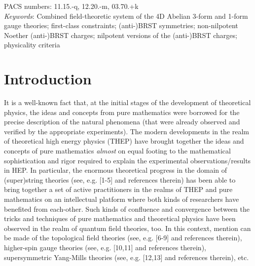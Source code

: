 \documentclass[12pt]{article}
\begin{document}
\vskip 1.0cm
\noindent
PACS numbers: 11.15.-q, 12.20.-m, 03.70.+k \\








\vskip 0.5cm
\noindent
{\it {Keywords}}: Combined field-theoretic system of the 4D  Abelian 3-form and 1-form gauge theories; first-class constraints;
(anti-)BRST symmetries; non-nilpotent Noether (anti-)BRST charges; nilpotent versions of the  (anti-)BRST charges; physicality criteria







\newpage

\section {Introduction}


It is a well-known fact that, at the initial stages of the development of theoretical physics, the ideas and concepts from pure mathematics were
borrowed for the precise description of the natural phenomena (that were already observed and verified by the appropriate experiments). 
The modern developments in  the realm of theoretical high
energy physics (THEP) have brought together the ideas and concepts of pure mathematics {\it almost} on equal footing to the mathematical sophistication and rigor
required to explain the experimental observations/results in HEP.
In particular, the enormous theoretical progress in the domain of (super)string theories (see, e.g. [1-5] and references therein) has been able to
bring together a set of active practitioners in the realms of THEP and pure mathematics on an intellectual platform where both kinds of researchers have benefited from each-other. Such kinds of confluence and convergence  
between the tricks and techniques of pure mathematics and theoretical physics  
have been observed in the realm of quantum field theories, too. In this context, mention can be made of the topological field theories (see, e.g. [6-9] and references therein),  higher-spin gauge theories (see, e.g. [10,11] and references therein), supersymmetric Yang-Mills theories (see, e.g. [12,13]
and references therein), etc.
\end{document}
